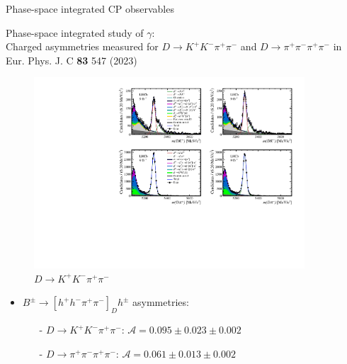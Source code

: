 \documentclass[xcolor={dvipsnames}]{beamer}
\begin{document}
\begin{frame}{Phase-space integrated CP observables}
  \begin{center}
    {\large Phase-space integrated study of $\gamma$: \\
    Charged asymmetries measured for $D\to K^+K^-\pi^+\pi^-$ and $D\to\pi^+\pi^-\pi^+\pi^-$ in Eur. Phys. J. C \textbf{83} 547 (2023)}
  \end{center}
  \vspace{-0.4cm}
  \begin{figure}
    \centering
    \includegraphics[width = 0.9\textwidth,trim={0 7cm 0 0},clip=true]{Plots/d2kkpipi_fiveL_allDP_GLW.pdf}
    \caption*{$D\to K^+K^-\pi^+\pi^-$}
  \end{figure}
  \vspace{-0.5cm}
  \begin{itemize}
    \item{$B^\pm\to[h^+h^-\pi^+\pi^-]_Dh^\pm$ asymmetries:}
    \begin{itemize}
      \item[-]{$D\to K^+K^-\pi^+\pi^-$: $\mathcal{A} = 0.095 \pm 0.023 \pm 0.002$}
      \item[-]{$D\to\pi^+\pi^-\pi^+\pi^-$: $\mathcal{A} = 0.061 \pm 0.013 \pm 0.002$}
    \end{itemize}
  \end{itemize}
\end{frame}
\end{document}
